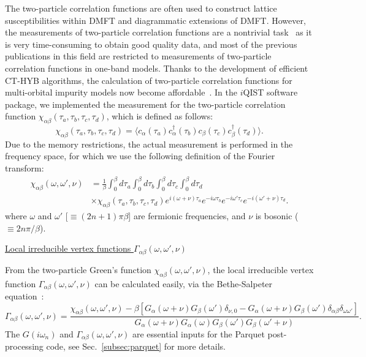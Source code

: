 The two-particle correlation functions are often used to construct lattice susceptibilities within DMFT and diagrammatic extensions of DMFT. However, the measurements of two-particle correlation functions are a nontrivial task~\cite{PhysRevB.83.085102} as it is very time-consuming to obtain good quality data, and most of the previous publications in this field are restricted to measurements of two-particle correlation functions in one-band models. Thanks to the development of efficient CT-HYB algorithms, the calculation of two-particle correlation functions for multi-orbital impurity models now become affordable~\cite{PhysRevB.84.075145,PhysRevB.89.235128,PhysRevB.85.205106}. In the $i$QIST software package, we implemented the measurement for the two-particle correlation function $\chi_{\alpha\beta}(\tau_a,\tau_b,\tau_c,\tau_d)$, which is defined as follows:
\begin{equation}
\chi_{\alpha\beta}(\tau_a,\tau_b,\tau_c,\tau_d)
= \langle c_{\alpha}(\tau_a)c^{\dagger}_{\alpha}(\tau_b)c_{\beta}(\tau_c)c^{\dagger}_{\beta}(\tau_d)\rangle.
\end{equation}
Due to the memory restrictions, the actual measurement is performed in the frequency space, for which we use the following definition of the Fourier transform:
\begin{align}
\chi_{\alpha\beta}(\omega,\omega',\nu) &= \frac{1}{\beta}
\int^{\beta}_{0}d\tau_a\int^{\beta}_{0}d\tau_b\int^{\beta}_{0}d\tau_c\int^{\beta}_{0}d\tau_d
\nonumber\\
&\times \chi_{\alpha\beta}(\tau_a,\tau_b,\tau_c,\tau_d) 
e^{i(\omega+\nu)\tau_a}e^{-i\omega\tau_b}e^{-i\omega'\tau_c}e^{-i(\omega'+\nu)\tau_d}.
\end{align}
where $\omega$ and $\omega'$ [$\equiv (2n+1)\pi\beta$] are fermionic frequencies, and $\nu$ is bosonic ($\equiv 2n\pi/\beta$).

\underline{Local irreducible vertex functions $\Gamma_{\alpha\beta}(\omega,\omega',\nu)$}

From the two-particle Green's function $\chi_{\alpha\beta}(\omega,\omega',\nu)$, the local irreducible vertex function $\Gamma_{\alpha\beta}(\omega,\omega',\nu)$ can be calculated easily, via the Bethe-Salpeter equation~\cite{PhysRevB.86.125114,PhysRevB.85.205106,PhysRevB.89.235128}:
\begin{equation}
\Gamma_{\alpha\beta}(\omega,\omega',\nu) = 
\frac{\chi_{\alpha\beta}(\omega,\omega',\nu) 
- \beta[G_\alpha(\omega+\nu)G_\beta(\omega')\delta_{\nu,0} 
- G_\alpha(\omega+\nu) G_\beta(\omega') \delta_{\alpha\beta}\delta_{\omega\omega'}]}
{G_\alpha(\omega+\nu)G_\alpha(\omega)G_\beta(\omega')G_\beta(\omega'+\nu)}.
\end{equation}
The $G(i\omega_n)$ and $\Gamma_{\alpha\beta}(\omega,\omega',\nu)$ are essential inputs for the Parquet post-processing code, see Sec.~\ref{subsec:parquet} for more details.

